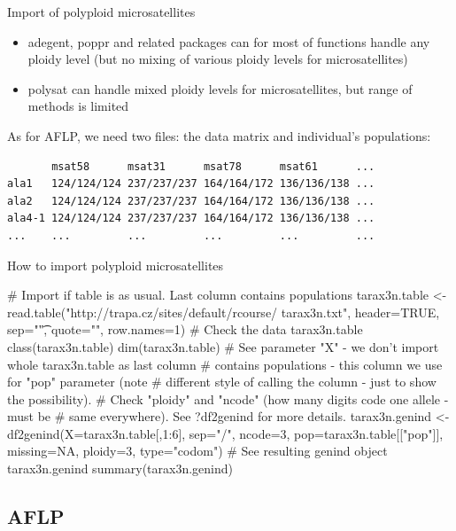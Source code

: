 \documentclass[compress, ucs, xelatex, 11pt, xcolor=svgnames,
  hyperref={
    bookmarks=true,
    unicode=true,
    colorlinks=true,
    pdftitle={Molecular data in R},
    plainpages=false,
    pdfauthor={Vojtech Zeisek},
    pdfsubject={Course about phylogeny and evolution in R},
    pdfcreator={XeLaTeX},
    pdfkeywords={R, evolution, phylogeny, molecular data},
    linkcolor=Tomato,
    anchorcolor=SaddleBrown,
    citecolor=Goldenrod,
    filecolor=DarkMagenta,
    menucolor=Sienna,
    urlcolor=DarkTurquoise,
    pdftex},
  url={hyphens, lowtilde} %
  ]{beamer}
\begin{document}
\begin{frame}[fragile]{Import of polyploid microsatellites}
\begin{itemize}
 \item adegent, poppr and related packages can for most of functions handle any ploidy level (but no mixing of various ploidy levels for microsatellites)
 \item polysat can handle mixed ploidy levels for microsatellites, but range of methods is limited
\end{itemize}
As for AFLP, we need two files: the data matrix and individual's populations:
\begin{verbatim}
       msat58      msat31      msat78      msat61      ...
ala1   124/124/124 237/237/237 164/164/172 136/136/138 ...
ala2   124/124/124 237/237/237 164/164/172 136/136/138 ...
ala4-1 124/124/124 237/237/237 164/164/172 136/136/138 ...
...    ...         ...         ...         ...         ...
\end{verbatim}
\end{frame}

\begin{frame}[fragile]{How to import polyploid microsatellites}
  \begin{spluscode}
    # Import if table is as usual. Last column contains populations
    tarax3n.table <- read.table("http://trapa.cz/sites/default/rcourse/
      tarax3n.txt", header=TRUE, sep="\t", quote="", row.names=1)
    # Check the data
    tarax3n.table
    class(tarax3n.table)
    dim(tarax3n.table)
    # See parameter "X" - we don't import whole tarax3n.table as last column
    # contains populations - this column we use for "pop" parameter (note
    # different style of calling the column - just to show the possibility).
    # Check "ploidy" and "ncode" (how many digits code one allele - must be
    # same everywhere). See ?df2genind for more details.
    tarax3n.genind <- df2genind(X=tarax3n.table[,1:6], sep="/", ncode=3,
      pop=tarax3n.table[["pop"]], missing=NA, ploidy=3, type="codom")
    # See resulting genind object
    tarax3n.genind
    summary(tarax3n.genind)
  \end{spluscode}
\end{frame}

\subsection{AFLP}
\end{document}
